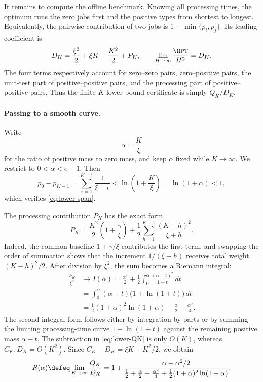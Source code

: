 It remains to compute the offline benchmark.  Knowing all processing times,
the optimum runs the zero jobs first and the positive types from shortest to
longest.  Equivalently, the pairwise contribution of two jobs is
$1+\min\{p_i,p_j\}$.  Its leading coefficient is
\begin{equation}
  D_K=\frac{\xi^2}{2}+\xi K+\frac{K^2}{2}+P_K,
  \qquad
  \lim_{H\to\infty}\frac{\OPT}{H^2}=D_K.
  \label{eq:lower-DK}
\end{equation}
The four terms respectively account for zero--zero pairs, zero--positive
pairs, the unit-test part of positive--positive pairs, and the processing
part of positive--positive pairs.  Thus the finite-$K$ lower-bound
certificate is simply $Q_K/D_K$.

\paragraph{Passing to a smooth curve.}
Write
\[
  \alpha=\frac K\xi
\]
for the ratio of positive mass to zero mass, and keep $\alpha$ fixed while
$K\to\infty$.  We restrict to $0<\alpha<e-1$.  Then
\[
 p_0-p_{K-1}
 =\sum_{r=1}^{K-1}\frac1{\xi+r}
 <\ln\!\left(1+\frac K\xi\right)
 =\ln(1+\alpha)<1,
\]
which verifies \cref{eq:lower-span}.

The processing contribution $P_K$ has the exact form
\begin{equation}
 P_K
 =\frac{K^2}{2}\left(1+\frac\gamma \xi\right)
  +\frac12\sum_{h=1}^{K-1}\frac{(K-h)^2}{\xi+h}.
 \label{eq:lower-P-exact}
\end{equation}
Indeed, the common baseline $1+\gamma/\xi$ contributes the first term, and
swapping the order of summation shows that the increment $1/(\xi+h)$ receives
total weight $(K-h)^2/2$.  After division by $\xi^2$, the sum becomes a
Riemann integral:
\begin{align}
 \frac{P_K}{\xi^2}&\longrightarrow I(\alpha)
   =\frac{\alpha^2}{2}
    +\frac12\int_0^\alpha\frac{(\alpha-t)^2}{1+t}\,dt
   \nonumber\\
 &=\int_0^\alpha(\alpha-t)\bigl(1+\ln(1+t)\bigr)\,dt
   \nonumber\\
 &=\frac12(1+\alpha)^2\ln(1+\alpha)
   -\frac\alpha2-\frac{\alpha^2}{4}.
 \label{eq:lower-I}
\end{align}
The second integral form follows either by integration by parts or by summing
the limiting processing-time curve $1+\ln(1+t)$ against the remaining
positive mass $\alpha-t$.
The subtraction in \cref{eq:lower-QK} is only $O(K)$, whereas
$C_K,D_K=\Theta(K^2)$.  Since $C_K-D_K=\xi K+K^2/2$, we obtain
\begin{equation}
 R(\alpha)
 \defeq\lim_{K\to\infty}\frac{Q_K}{D_K}
 =1+
 \frac{\alpha+\alpha^2/2}
 {\frac12+\frac\alpha2+\frac{\alpha^2}{4}
  +\frac12(1+\alpha)^2\ln(1+\alpha)}.
 \label{eq:lower-Ralpha}
\end{equation}

